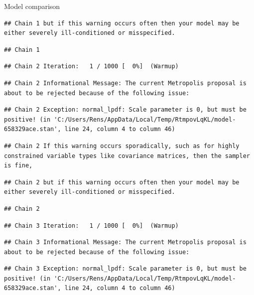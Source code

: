 \documentclass[
  ignorenonframetext,
]{beamer}
\begin{document}
\begin{frame}[fragile]{Model comparison}
\begin{verbatim}
## Chain 1 but if this warning occurs often then your model may be either severely ill-conditioned or misspecified.
\end{verbatim}

\begin{verbatim}
## Chain 1
\end{verbatim}

\begin{verbatim}
## Chain 2 Iteration:   1 / 1000 [  0%]  (Warmup)
\end{verbatim}

\begin{verbatim}
## Chain 2 Informational Message: The current Metropolis proposal is about to be rejected because of the following issue:
\end{verbatim}

\begin{verbatim}
## Chain 2 Exception: normal_lpdf: Scale parameter is 0, but must be positive! (in 'C:/Users/Rens/AppData/Local/Temp/RtmpovLqKL/model-658329ace.stan', line 24, column 4 to column 46)
\end{verbatim}

\begin{verbatim}
## Chain 2 If this warning occurs sporadically, such as for highly constrained variable types like covariance matrices, then the sampler is fine,
\end{verbatim}

\begin{verbatim}
## Chain 2 but if this warning occurs often then your model may be either severely ill-conditioned or misspecified.
\end{verbatim}

\begin{verbatim}
## Chain 2
\end{verbatim}

\begin{verbatim}
## Chain 3 Iteration:   1 / 1000 [  0%]  (Warmup)
\end{verbatim}

\begin{verbatim}
## Chain 3 Informational Message: The current Metropolis proposal is about to be rejected because of the following issue:
\end{verbatim}

\begin{verbatim}
## Chain 3 Exception: normal_lpdf: Scale parameter is 0, but must be positive! (in 'C:/Users/Rens/AppData/Local/Temp/RtmpovLqKL/model-658329ace.stan', line 24, column 4 to column 46)
\end{verbatim}


\end{frame}
\end{document}
